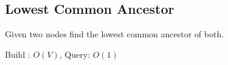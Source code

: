 \subsection{Lowest Common Ancestor}

Given two nodes find the lowest common ancestor of both.

Build : $O(V)$, Query: $O(1)$



